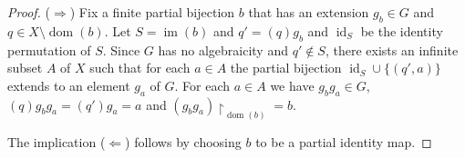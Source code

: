 \documentclass[11pt]{amsart}
\makeatletter
\theoremstyle{definition}
\newtheorem{definition}[theorem]{Definition}
\newtheorem{example}[theorem]{Example}
\newcommand{\Q}{\mathbb Q}
\newcommand{\im}{\operatorname{im}}
\newcommand{\dom}{\operatorname{dom}}
\newcommand{\Sym}{\operatorname{Sym}}
\def\id{\operatorname{id}}
\newcommand{\makeset}[2]{\left\lbrace #1 \;\middle|\;
 \begin{tabular}{@{}l@{}}
   #2
  \end{tabular}
  \right\rbrace}
\makeatother
\begin{document}
\begin{proof}
 ($\Rightarrow$) Fix a finite partial bijection $b$ that has an extension $g_b\in G$ and $q\in X\setminus \dom(b)$. Let $S=\im(b)$ and $q'=(q)g_b$ and $\id_S$ be the identity permutation of $S$. Since $G$ has no algebraicity and $q'\notin S$, there exists an infinite subset $A$ of $X$ such that for each $a\in A$ the partial bijection $\id_S\cup\{(q',a)\}$ extends to an element $g_a$ of $G$. For each $a\in A$ we have $g_bg_a\in G$, $(q)g_bg_a=(q')g_a=a$ and $(g_bg_a){\restriction}_{\dom(b)}=b$.   

 The implication ($\Leftarrow$) follows by choosing $b$ to be a partial identity map. 
\end{proof}





\end{document}
